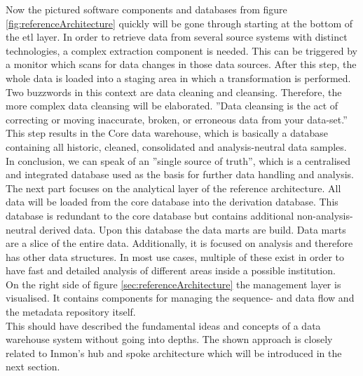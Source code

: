 Now the pictured software components and databases from figure \ref{fig:referenceArchitecture} quickly  will be gone through starting at the bottom of the \acrfull{etl} layer. In order to retrieve data from several source systems with distinct technologies, a complex extraction component is needed. This can be triggered by a monitor which scans for data changes in those data sources.\newline
After this step, the whole data is loaded into a staging area in which a transformation is performed. Two buzzwords in this context are data cleaning and cleansing. Therefore, the more complex data cleansing will be elaborated.
''Data cleansing is the act of correcting or moving inaccurate, broken, or erroneous data from your data-set.'' \cite{dataCleansing}
This step results in the Core data warehouse, which is basically a database containing all historic, cleaned, consolidated and analysis-neutral data samples. In conclusion, we can speak of an ''single source of truth''\cite{scriptRasch}, which is a centralised and integrated database used as the basis for further data handling and analysis.\newline
\\
The next part focuses on the analytical layer of the reference architecture. All data will be loaded from the core database into the derivation database. This database is redundant to the core database but contains additional non-analysis-neutral derived data. Upon this database the data marts are build. Data marts are a slice of the entire data. Additionally, it is focused on analysis and therefore has other data structures. In most use cases, multiple of these exist in order to have fast and detailed analysis of different areas inside a possible institution.\newline
\\
On the right side of figure \ref{sec:referenceArchitecture} the management layer is visualised. It contains components for managing the sequence- and data flow and the metadata repository itself. 
\newline
\\
This should have described the fundamental ideas and concepts of a data warehouse system without going into depths. The shown approach is closely related to Inmon's hub and spoke architecture which will be introduced in the next section. 
